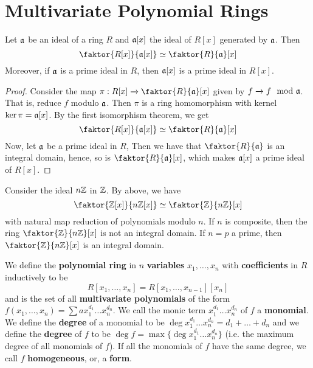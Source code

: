 \section{Multivariate Polynomial Rings}
\label{section_7.1}

\begin{theorem}\label{theorem_6.1.1}
  Let $\mathfrak{a}$ be an ideal of a ring $R$ and $\mathfrak{a}[x]$ the ideal of $R[x]$ generated by
  $\mathfrak{a}$. Then
  \begin{equation*}
    \faktor{R[x]}{\af[x]} \simeq \faktor{R}{\af}[x]
  \end{equation*}
  Moreover, if $\mathfrak{a}$ is a prime ideal in $R$, then $\mathfrak{a}[x]$ is a prime ideal in
  $R[x]$.
\end{theorem}
\begin{proof}
  Consider the map $\pi:R[x] \xrightarrow{} \faktor{R}{\af}[x]$ given by $f
  \xrightarrow{} f \mod{\mathfrak{a}}$. That is, reduce $f$ modulo $\mathfrak{a}$. Then $\pi$ is a
  ring homomorphism with kernel $\ker{\pi}=\mathfrak{a}[x]$. By the first isomorphism
  theorem, we get
  \begin{equation*}
    \faktor{R[x]}{\af[x]} \simeq \faktor{R}{\af}[x]
  \end{equation*}
  Now, let $\mathfrak{a}$ be a prime ideal in $R$, Then we have that
  $\faktor{R}{\af}$ is an integral domain, hence, so is $\faktor{R}{\af}[x]$,
  which makes $\mathfrak{a}[x]$ a prime ideal of $R[x]$.
\end{proof}

\begin{example}\label{example_6.1}
  Consider the ideal $n\mathbb{Z}$ in  $\mathbb{Z}$. By above, we have
  \begin{equation*}
    \faktor{\Z[x]}{n\Z[x]} \simeq \faktor{\Z}{n\Z}[x]
  \end{equation*}
  with natural map reduction of polynomials modulo $n$. If $n$ is composite,
  then the ring $\faktor{\Z}{n\Z}[x]$ is not an integral domain. If $n=p$ a
  prime, then  $\faktor{\Z}{n\Z}[x]$ is an integral domain.
\end{example}

\begin{definition}
  We define the \textbf{polynomial ring} in $n$  \textbf{variables} $x_1,
  \dots, x_n$ with \textbf{coefficients} in $R$ inductively to be
  \begin{equation*}
    R[x_1, \dots, x_n]=R[x_1, \dots, x_{n-1}][x_n]
  \end{equation*}
  and is the set of all \textbf{multivariate polynomials} of the form $f(x_1,
  \dots,x_n)=\sum{ax_1^{d_1} \dots x_n^{d_n}}$. We call the monic term
  $x_1^{d_1} \dots x_n^{d_n}$ of $f$ a  \textbf{monomial}. We define the
  \textbf{degree} of a monomial to be $\deg{x_1^{d_1} \dots
  x_n^{d_n}}=d_1+\dots+d_n$ and we define the \textbf{degree} of $f$ to be
  $\deg{f}=\max{\{\deg{x_1^{d_1} \dots x_n^{d_n}}\}}$ (i.e. the maximum degree
  of all monomials of $f$). If all the monomials of $f$ have the same degree,
  we call  $f$  \textbf{homogeneous}, or, a \textbf{form}.
\end{definition}

